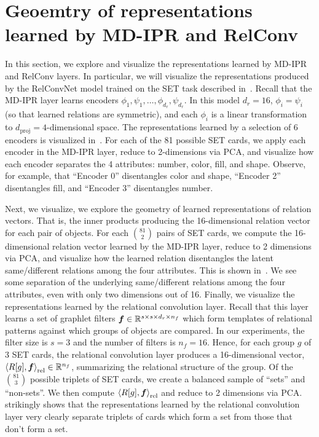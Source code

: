 \section{Geoemtry of representations learned by MD-IPR and RelConv}\label{sec:appendix_rep_analysis}

In this section, we explore and visualize the representations learned by MD-IPR and RelConv layers. In particular, we will visualize the representations produced by the RelConvNet model trained on the SET task described in~. Recall that the MD-IPR layer learns encoders $\phi_1, \psi_1, \ldots, \phi_{d_r}, \psi_{d_r}$. In this model $d_r = 16$, $\phi_i = \psi_i$ (so that learned relations are symmetric), and each $\phi_i$ is a linear transformation to $d_{\mathrm{proj}} = 4$-dimensional space. The representations learned by a selection of 6 encoders is visualized in~. For each of the 81 possible SET cards, we apply each encoder in the MD-IPR layer, reduce to 2-dimensions via PCA, and visualize how each encoder separates the 4 attributes: number, color, fill, and shape. Observe, for example, that ``Encoder 0'' disentangles color and shape, ``Encoder 2'' disentangles fill, and ``Encoder 3'' disentangles number.

Next, we visualize, we explore the geometry of learned representations of relation vectors. That is, the inner products producing the 16-dimensional relation vector for each pair of objects. For each $\binom{81}{2}$ pairs of SET cards, we compute the 16-dimensional relation vector learned by the MD-IPR layer, reduce to 2 dimensions via PCA, and visualize how the learned relation disentangles the latent same/different relations among the four attributes. This is shown in~. We see some separation of the underlying same/different relations among the four attributes, even with only two dimensions out of 16.
Finally, we visualize the representations learned by the relational convolution layer. Recall that this layer learns a set of graphlet filters $\bm{f} \in \mathbb{R}^{s \times s \times d_r \times n_f}$ which form templates of relational patterns against which groups of objects are compared. In our experiments, the filter size is $s = 3$ and the number of filters is $n_f = 16$. Hence, for each group $g$ of 3 SET cards, the relational convolution layer produces a 16-dimensional vector, $\left\langle R[g], \bm{f} \right\rangle_\mathrm{rel} \in \mathbb{R}^{n_f}$, summarizing the relational structure of the group. Of the $\binom{81}{3}$ possible triplets of SET cards, we create a balanced sample of ``sets'' and ``non-sets''. We then compute $\left\langle R[g], \bm{f} \right\rangle_\mathrm{rel}$ and reduce to 2 dimensions via PCA.~ strikingly shows that the representations learned by the relational convolution layer very clearly separate triplets of cards which form a set from those that don't form a set.
\newpage

